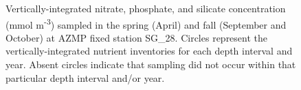 \documentclass[12pt]{article}\usepackage[]{graphicx}\usepackage[]{color}
\begin{document}
\begin{figure}[htb]

{\centering {} 

}

\caption{Vertically-integrated nitrate, phosphate, and silicate concentration (mmol m\textsuperscript{-3}) sampled in the spring (April) and fall (September and October) at AZMP fixed station SG\_28. Circles represent the vertically-integrated nutrient inventories for each depth interval and year. Absent circles indicate that sampling did not occur within that particular depth interval and/or year.}\label{fig:figure19}
\end{figure}
\clearpage
\end{document}
